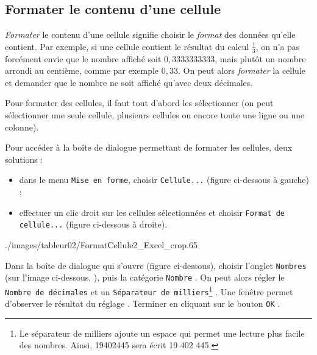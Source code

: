 \subsection{Formater le contenu d'une cellule}\label{Calc2FormaterCellule} 

\emph{Formater} le contenu d'une cellule signifie choisir le \emph{format} des données qu'elle contient. Par exemple, si une cellule contient le résultat du calcul $\frac{1}{3}$, on n'a pas forcément envie que le nombre affiché soit $0,3333333333$, mais plutôt un nombre arrondi au centième, comme par exemple $0,33$. On peut alors \emph{formater} la cellule et demander que le nombre ne soit affiché qu'avec deux décimales.

Pour formater des cellules, il faut tout d'abord les sélectionner (on peut sélectionner une seule cellule, plusieurs cellules ou encore toute une ligne ou une colonne).



Pour accéder à la boîte de dialogue permettant de formater les cellules, deux solutions :
\begin{itemize}
\item dans le menu \texttt{Mise en forme}, choisir \texttt{Cellule...} (figure ci-dessous à gauche) ;    
\item effectuer un clic droit sur les cellules sélectionnées et choisir \texttt{Format de cellule...} (figure ci-dessous à droite).
\end{itemize}

%  
              {./images/tableur02/FormatCellule2_Excel_crop}{.65\textwidth}

Dans la boîte de dialogue qui s'ouvre (figure ci-dessous), choisir l'onglet \texttt{Nombres} (sur l'image ci-dessous, ), puis la catégorie \texttt{Nombre} . On peut alors régler le \texttt{Nombre de décimales}  et un \texttt{Séparateur de milliers}\footnote{Le séparateur de milliers ajoute un espace qui permet une lecture plus facile des nombres. Ainsi, 19402445 sera écrit 19 402 445.} . Une fenêtre permet d'observer le résultat du réglage . Terminer en cliquant sur le bouton \texttt{OK} .              

